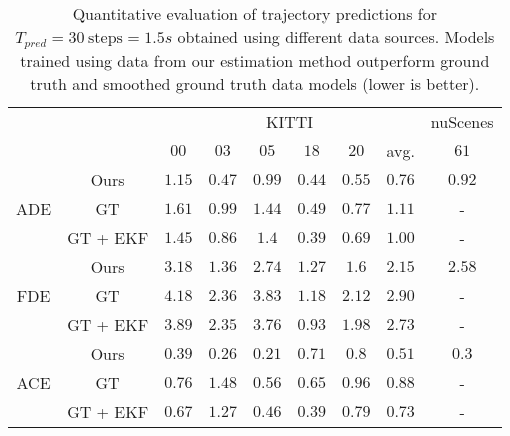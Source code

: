 \begin{table}[t]
\footnotesize
\centering
\setlength{\tabcolsep}{3.5pt}
\caption{\small{Quantitative evaluation of trajectory predictions for $T_{pred}= 30 \ \text{steps} =  1.5s$ obtained using different data sources. Models trained using data from our estimation method outperform ground truth and smoothed ground truth data models (lower is better).}}
\label{tab:results_prediction}
\begin{tabular}{c|c|ccccc|c|c}
\toprule
 & & \multicolumn{6}{c|}{KITTI}& \multicolumn{1}{c}{nuScenes}\\
 & & $00$ & $03$ & $05$ & $18$ & $20$ & avg. & $61$\\
\midrule
\midrule
\multirow{3}{*}{ADE} & Ours & $\mathbf{1.15}$ & $\mathbf{0.47}$ & $\mathbf{0.99}$ & $0.44$ & $\mathbf{0.55}$ & $\mathbf{0.76}$ & $0.92$\\
 & GT & $1.61$ & $0.99$ & $1.44$ & $0.49$ & $0.77$ & $1.11$ & - \\
 & GT + EKF & $1.45$ & $0.86$ & $1.4$ & $\mathbf{0.39}$ & $0.69$ & $1.00$ & - \\
\midrule
\multirow{3}{*}{FDE} & Ours & $\mathbf{3.18}$ & $\mathbf{1.36}$ & $\mathbf{2.74}$ & $1.27$ & $\mathbf{1.6}$ & $\mathbf{2.15}$ & $2.58$\\
 & GT & $4.18$ & $2.36$ & $3.83$ & $1.18$ & $2.12$ & $2.90$ & - \\
 & GT + EKF & $3.89$ & $2.35$ & $3.76$ & $\mathbf{0.93}$ & $1.98$ & $2.73$ & - \\
\midrule
\multirow{3}{*}{ACE} & Ours & $\mathbf{0.39}$ & $\mathbf{0.26}$ & $\mathbf{0.21}$ & $0.71$ & $0.8$ & $\mathbf{0.51}$ & $0.3$ \\
 & GT & $0.76$ & $1.48$ & $0.56$ & $0.65$ & $0.96$ & $0.88$ & - \\
 & GT + EKF & $0.67$ & $1.27$ & $0.46$ & $\mathbf{0.39}$ & $\mathbf{0.79}$ & $0.73$ & - \\
\bottomrule
\end{tabular}
\vspace{-2mm}
\end{table}

